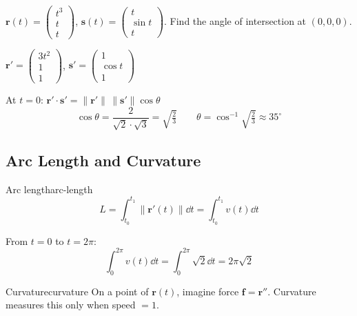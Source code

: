 \begin{example}
  $\mathbf{r}(t) =
    \begin{pmatrix}
      t^{3} \\ t \\ t
    \end{pmatrix}
  $, \;
  $\mathbf{s}(t) =
    \begin{pmatrix}
      t \\ \sin t \\ t
    \end{pmatrix}
  $.
  Find the angle of intersection at $(0,0,0)$.

  $\mathbf{r}' =
    \begin{pmatrix}
      3t^{2} \\ 1 \\ 1
    \end{pmatrix}
  $, \;
  $\mathbf{s}' =
    \begin{pmatrix}
      1 \\ \cos t \\ 1
    \end{pmatrix}
  $

  At $t=0$: \;
  $\mathbf{r}'\cdot\mathbf{s}' = \lVert\mathbf{r}'\rVert\,\lVert\mathbf{s}'\rVert\cos\theta$
  \[
    \cos\theta = \frac{2}{\sqrt{2}\cdot\sqrt{3}} = \sqrt{\tfrac{2}{3}}
    \qquad
    \theta = \cos^{-1}\!\sqrt{\tfrac{2}{3}} \approx 35^{\circ}
  \]
\end{example}

\subsection{Arc Length and Curvature}

\begin{definition}{Arc length}{arc-length}
  \[
    L = \int_{t_{0}}^{t_{1}}\lVert\mathbf{r}'(t)\rVert\dd{t}
    = \int_{t_{0}}^{t_{1}}v(t)\dd{t}
  \]
\end{definition}

\begin{example}
  From $t=0$ to $t=2\pi$:
  \[
    \int_{0}^{2\pi}v(t)\dd{t}
    = \int_{0}^{2\pi}\sqrt{2}\dd{t}
    = 2\pi\sqrt{2}
  \]
\end{example}

\begin{definition}{Curvature}{curvature}
  On a point of $\mathbf{r}(t)$, imagine force $\mathbf{f}=\mathbf{r}''$.
  Curvature measures this only when speed $=1$.
\end{definition}

